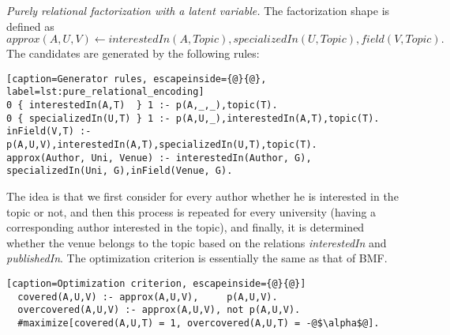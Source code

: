 \textit{Purely relational factorization with a latent variable.} The factorization shape is defined as
\begin{equation*}
  \textit{approx}(A,U,V) \leftarrow \textit{interestedIn}(A, \textit{Topic}), \textit{specializedIn}(U, \textit{Topic}), \textit{field}(V, \textit{Topic}).
\end{equation*}
The candidates are generated by the following rules:
  \begin{lstlisting}[caption=Generator rules, escapeinside={@}{@}, label=lst:pure_relational_encoding] 
0 { interestedIn(A,T)  } 1 :- p(A,_,_),topic(T).
0 { specializedIn(U,T) } 1 :- p(A,U,_),interestedIn(A,T),topic(T).
inField(V,T) :- p(A,U,V),interestedIn(A,T),specializedIn(U,T),topic(T).
approx(Author, Uni, Venue) :- interestedIn(Author, G), specializedIn(Uni, G),inField(Venue, G).\end{lstlisting}
The idea is that we first consider for every author whether he is interested in the topic or not, 
and then this process is repeated for every university (having a corresponding author interested in the topic), and finally, it is determined whether the venue belongs to the topic based on the relations {\it interestedIn} and {\it publishedIn}. The optimization criterion is essentially the same as that of BMF.
\begin{lstlisting}[caption=Optimization criterion, escapeinside={@}{@}] 
  covered(A,U,V) :- approx(A,U,V),     p(A,U,V).
  overcovered(A,U,V) :- approx(A,U,V), not p(A,U,V).
  #maximize[covered(A,U,T) = 1, overcovered(A,U,T) = -@$\alpha$@].
\end{lstlisting}
